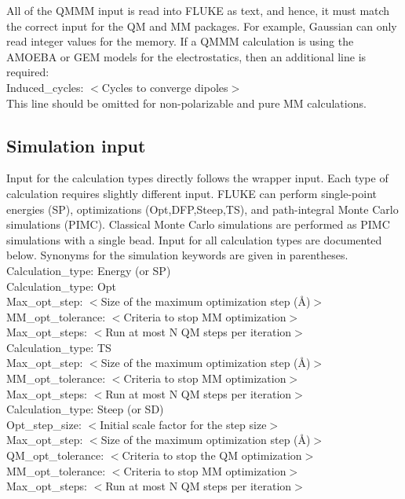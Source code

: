 \documentclass[12pt]{report}
\begin{document}
All of the QMMM input is read into FLUKE as text, and hence, it must match the
correct input for the QM and MM packages. For example, Gaussian can only read
integer values for the memory. If a QMMM calculation is using the AMOEBA or
GEM models for the electrostatics, then an additional line is required: \\

Induced\_cycles: $<$Cycles to converge dipoles$>$ \\

This line should be omitted for non-polarizable and pure MM calculations.

\subsection{Simulation input}

Input for the calculation types directly follows the wrapper input. Each type
of calculation requires slightly different input. FLUKE can perform
single-point energies (SP), optimizations (Opt,DFP,Steep,TS), and
path-integral Monte Carlo simulations (PIMC). Classical Monte Carlo
simulations are performed as PIMC simulations with a single bead. Input for
all calculation types are documented below. Synonyms for the simulation
keywords are given in parentheses. \\

Calculation\_type: Energy (or SP) \\

Calculation\_type: Opt \\
Max\_opt\_step: $<$Size of the maximum optimization step (\AA)$>$ \\
MM\_opt\_tolerance: $<$Criteria to stop MM optimization$>$ \\
Max\_opt\_steps: $<$Run at most N QM steps per iteration$>$ \\

Calculation\_type: TS \\
Max\_opt\_step: $<$Size of the maximum optimization step (\AA)$>$ \\
MM\_opt\_tolerance: $<$Criteria to stop MM optimization$>$ \\
Max\_opt\_steps: $<$Run at most N QM steps per iteration$>$ \\

Calculation\_type: Steep (or SD) \\
Opt\_step\_size: $<$Initial scale factor for the step size$>$ \\
Max\_opt\_step: $<$Size of the maximum optimization step (\AA)$>$
QM\_opt\_tolerance: $<$Criteria to stop the QM optimization$>$\\
MM\_opt\_tolerance: $<$Criteria to stop MM optimization$>$ \\
Max\_opt\_steps: $<$Run at most N QM steps per iteration$>$ \\
\end{document}
